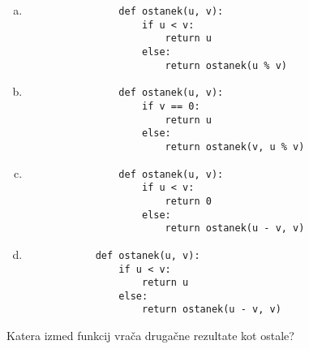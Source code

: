 \documentclass[arhiv, 10pt]{../izpit}
\begin{document}
        \begin{multicols}{2}
        \begin{enumerate}[(a)]
\item 
                \begin{verbatim}
                def ostanek(u, v):
                    if u < v:
                        return u
                    else:
                        return ostanek(u % v)
                \end{verbatim}
            
\item 
                \begin{verbatim}
                def ostanek(u, v):
                    if v == 0:
                        return u
                    else:
                        return ostanek(v, u % v)
                \end{verbatim}
            
\item 
                \begin{verbatim}
                def ostanek(u, v):
                    if u < v:
                        return 0
                    else:
                        return ostanek(u - v, v)
                \end{verbatim}
            
\item 
            \begin{verbatim}
            def ostanek(u, v):
                if u < v:
                    return u
                else:
                    return ostanek(u - v, v)
            \end{verbatim}
        
\end{enumerate}

        \end{multicols}
    
        \naloga*
        
        Katera izmed funkcij vrača drugačne rezultate kot ostale?
    
\end{document}
